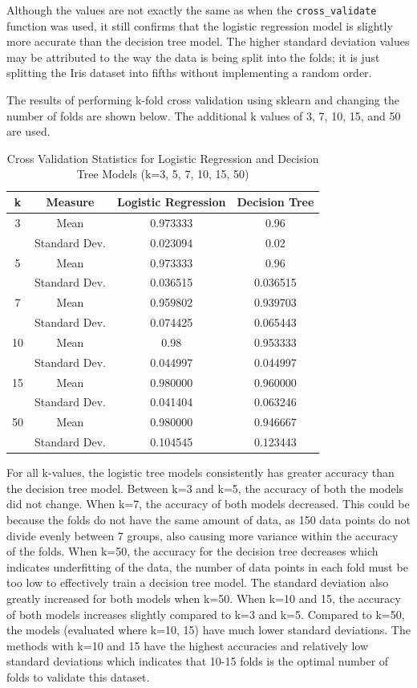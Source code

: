 \documentclass[journal]{IEEEtran}
\begin{document}
Although the values are not exactly the same as when the \lstinline{cross_validate} function was used, it still confirms that the logistic regression model is slightly more accurate than the decision tree model. The higher standard deviation values may be attributed to the way the data is being split into the folds; it is just splitting the Iris dataset into fifths without implementing a random order. 

The results of performing k-fold cross validation using sklearn and changing the number of folds are shown below. The additional k values of 3, 7, 10, 15, and 50 are used.

\begin{table}[h!]
\centering
\begin{tabular}{ c | c | c c }
k & Measure & Logistic Regression & Decision Tree \\
\hline
3 & Mean & 0.973333 & 0.96 \\
& Standard Dev.  & 0.023094 & 0.02 \\
\hline
5 & Mean & 0.973333 & 0.96 \\
& Standard Dev.  & 0.036515 & 0.036515 \\
 \hline
7 & Mean & 0.959802 & 0.939703 \\
 & Standard Dev.  & 0.074425 & 0.065443 \\
 \hline
10 & Mean & 0.98 & 0.953333 \\
 & Standard Dev.  & 0.044997 & 0.044997 \\
 \hline
15 & Mean&	0.980000&	0.960000 \\
&Standard Dev.&	0.041404&	0.063246 \\
\hline
50 & Mean &	0.980000 &	0.946667 \\
 & Standard Dev. &	0.104545 &	0.123443
\end{tabular}
\caption{Cross Validation Statistics for Logistic Regression and Decision Tree Models (k=3, 5, 7, 10, 15, 50)}
\label{table:MultiFoldCV}
\end{table}

For all k-values, the logistic tree models consistently has greater accuracy than the decision tree model. Between k=3 and k=5, the accuracy of both the models did not change. When k=7, the accuracy of both models decreased. This could be because the folds do not have the same amount of data, as 150 data points do not divide evenly between 7 groups, also causing more variance within the accuracy of the folds. When k=50, the accuracy for the decision tree decreases which indicates underfitting of the data, the number of data points in each fold must be too low to effectively train a decision tree model. The standard deviation also greatly increased for both models when k=50. When k=10 and 15, the accuracy of both models increases slightly compared to k=3 and k=5. Compared to k=50, the models (evaluated where k=10, 15) have much lower standard deviations. The methods with k=10 and 15 have the highest accuracies and relatively low standard deviations which indicates that 10-15 folds is the optimal number of folds to validate this dataset.
\end{document}
